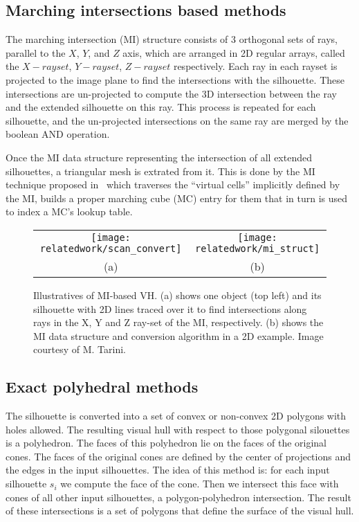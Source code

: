 \subsection{Marching intersections based methods}
The marching intersection (MI) structure consists of 3 orthogonal sets of rays, parallel to the $X$, $Y$, and $Z$ axis, which are arranged in 2D regular arrays, called the $X-rayset$, $Y-rayset$, $Z-rayset$ respectively. Each ray in each rayset is projected to the image plane to find the intersections with the silhouette. These intersections are un-projected to compute the 3D intersection between the ray and the extended silhouette on this ray. This process is repeated for each silhouette, and the un-projected intersections on the same ray are merged by the boolean AND operation.

Once the MI data structure representing the intersection of all extended silhouettes, a triangular mesh is extrated from it. This is done by the MI technique proposed in~\cite{rocchini2001marching} which traverses the ``virtual cells'' implicitly defined by the MI, builds a proper marching cube (MC) entry for them that in turn is used to index a MC's lookup table.

\begin{figure}[h]
\centering
\begin{tabular}{cc}
\texttt{[image: relatedwork/scan\_convert]}&
\texttt{[image: relatedwork/mi\_struct]}\\
(a) & (b)\\
\end{tabular}
\caption{Illustratives of MI-based VH. (a) shows one object (top left) and its silhouette with 2D lines traced over it to find intersections along rays in the X, Y and Z ray-set of the MI, respectively. (b) shows the MI data structure and conversion algorithm in a 2D example. Image courtesy of M. Tarini.}
\label{fig:robust_pc}
\end{figure}

\subsection{Exact polyhedral methods}
The silhouette is converted into a set of convex or non-convex 2D polygons with holes allowed. The resulting visual hull with respect to those polygonal silouettes is a polyhedron. The faces of this polyhedron lie on the faces of the original cones. The faces of the original cones are defined by the center of projections and the edges in the input silhouettes. The idea of this method is: for each input silhouette $s_i$ we compute the face of the cone. Then we intersect this face with cones of all other input silhouettes, \ie a polygon-polyhedron intersection. The result of these intersections is a set of polygons that define the surface of the visual hull.

